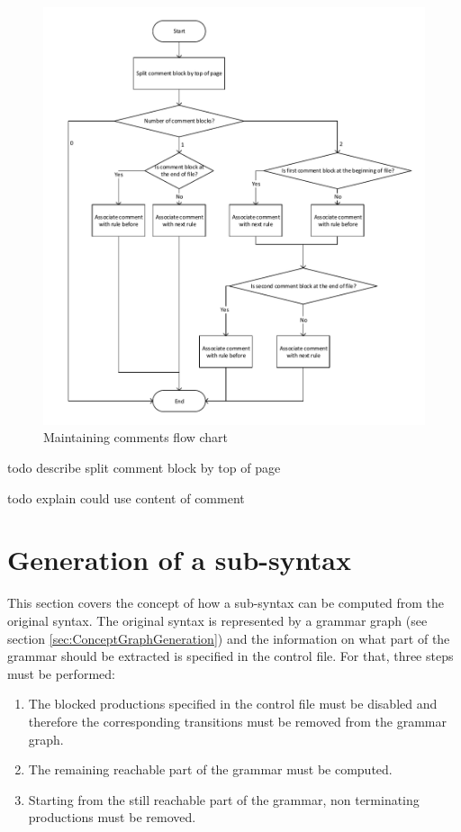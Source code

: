 \begin{figure}[H]
\centering
\includegraphics[width=1\textwidth]{images/Concept_maintaining_comments.pdf}
\caption{Maintaining comments flow chart}
\label{fig:ConceptMaintainingComments}
\end{figure}
todo describe split comment block by top of page

todo explain could use content of comment
\section{Generation of a sub-syntax}\label{sec:ConceptGenerateReducedGrammar}
This section covers the concept of how a sub-syntax can be computed from the original syntax.
The original syntax is represented by a grammar graph (see section \ref{sec:ConceptGraphGeneration}) and the information on what part of the grammar should be extracted is specified in the control file.
For that, three steps must be performed:

\begin{enumerate}%
	\item The blocked productions specified in the control file must be disabled and therefore the corresponding transitions must be removed from the grammar graph.
	\item The remaining reachable part of the grammar must be computed.
	\item Starting from the still reachable part of the grammar, non terminating productions must be removed.
\end{enumerate}

